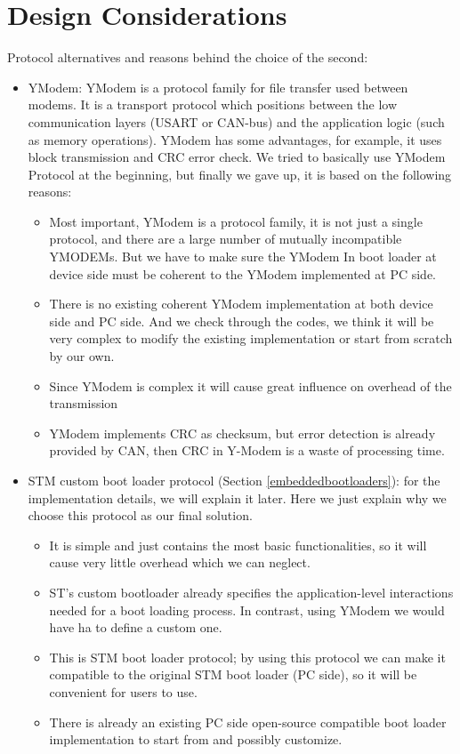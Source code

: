 \documentclass[11pt]{article} %
\begin{document}
\section{Design Considerations}
Protocol alternatives and reasons behind the choice of the second:
\begin{itemize}
\item YModem: YModem is a protocol family for file transfer used between modems. It is a transport protocol which positions between the low communication layers (USART or CAN-bus) and the application logic (such as memory operations). 
YModem has some advantages, for example, it uses block transmission and CRC error check.
We tried to basically use YModem Protocol at the beginning, but finally we gave up, it is based on the following reasons:
\begin{itemize}
\item Most important, YModem is a protocol family, it is not just a single protocol, and there are a large number of mutually incompatible YMODEMs. But we have to make sure the YModem In boot loader at device side must be coherent to the YModem implemented at PC side.
\item There is no existing coherent YModem implementation at both device side and PC side. And we check through the codes, we think it will be very complex to modify the existing implementation or start from scratch by our own.
\item Since YModem is complex it will cause great influence on overhead of the transmission
\item YModem implements CRC as checksum, but error detection is already provided by CAN, then CRC in Y-Modem is a waste of processing time.
\end{itemize}
\item STM custom boot loader protocol (Section \ref{embeddedbootloaders}): for the implementation details, we will explain it later. Here we just explain why we choose this protocol as our final solution.
\begin{itemize}
\item It is simple and just contains the most basic functionalities, so it will cause very little overhead which we can neglect.
\item ST's custom bootloader already specifies the application-level interactions needed for a boot loading process. In contrast, using YModem we would have ha to define a custom one.
\item This is STM boot loader protocol; by using this protocol we can make it compatible to the original STM boot loader (PC side), so it will be convenient for users to use. 
\item There is already an existing PC side open-source compatible boot loader implementation to start from and possibly customize.
\end{itemize}
\end{itemize}
\end{document}
